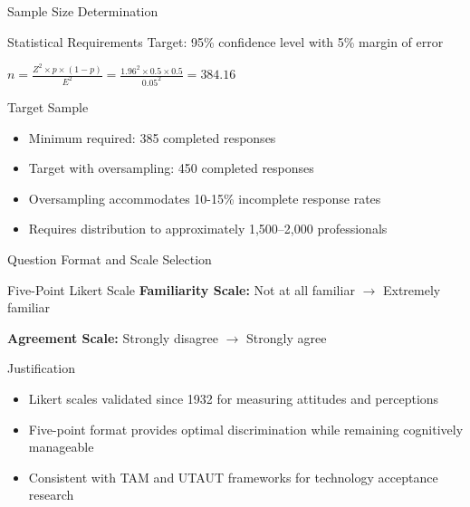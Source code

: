 \documentclass{beamer}
\begin{document}
\begin{frame}[allowframebreaks]{Sample Size Determination}
  \begin{block}{Statistical Requirements}
    Target: 95\% confidence level with 5\% margin of error

    \vspace{0.2cm}
    \(n = \frac{Z^2 \times p \times (1-p)}{E^2} = \frac{1.96^2 \times 0.5 \times 0.5}{0.05^2} = 384.16\)
  \end{block}

  \begin{block}{Target Sample}
    \begin{itemize}
      \item Minimum required: 385 completed responses
      \item Target with oversampling: 450 completed responses
      \item Oversampling accommodates 10-15\% incomplete response rates
      \item Requires distribution to approximately 1,500--2,000 professionals
    \end{itemize}
  \end{block}
\end{frame}

\begin{frame}[allowframebreaks]{Question Format and Scale Selection}
  \begin{block}{Five-Point Likert Scale}
    \textbf{Familiarity Scale:} Not at all familiar \(\rightarrow\) Extremely familiar

    \vspace{0.2cm}
    \textbf{Agreement Scale:} Strongly disagree \(\rightarrow\) Strongly agree
  \end{block}

  \begin{block}{Justification}
    \begin{itemize}
      \item Likert scales validated since 1932 for measuring attitudes and perceptions
      \item Five-point format provides optimal discrimination while remaining cognitively manageable
      \item Consistent with TAM and UTAUT frameworks for technology acceptance research
    \end{itemize}
  \end{block}
\end{frame}
\end{document}
